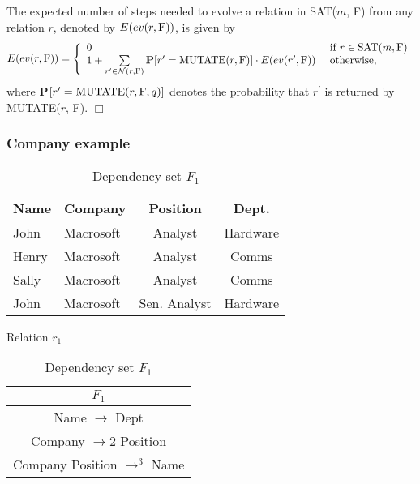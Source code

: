 \begin{proposition}\label{lemma:evolve}
\begin{rm}
The expected number of steps needed to evolve
a relation in SAT($m$, F) from any relation $r$, 
denoted by $E(ev(r, {\rm F}))$, is given by 
\begin{displaymath}
E(ev(r, {\rm F})) = \left\{ 
\begin{array}{l@{\quad}l}
0 & \mbox{ if } r \in {\rm SAT}(m, {\rm F}) \\
1 + \sum\limits_{r^\prime \in {\cal N}(r, {\rm F})} 
{\bf P}[r^\prime = {\rm MUTATE}(r, {\rm F})] \cdot
E(ev(r^\prime, {\rm F})) & \mbox{ otherwise,} \\
\end{array} \right.
\end{displaymath}
where {\bf P}$[r^\prime = {\rm MUTATE}(r, {\rm F}, q)]$ 
denotes the probability that $r^\prime$ is returned by MUTATE($r$, F).
\quad $\Box$
\end{rm}
\end{proposition}
\medskip

\subsubsection{Company example}

{\line
\begin{table}[ht]
\begin{minipage}[b]{16cm}
\begin{center}
\begin{tabular}{|l|l|c|c|} \hline
{\bf Name} & {\bf Company} & {\bf  Position} & {\bf Dept.}  \\ \hline \hline
John & Macrosoft & Analyst  & Hardware  \\ 
Henry & Macrosoft & Analyst  &  Comms\\
Sally & Macrosoft & Analyst  &  Comms \\ 
John & Macrosoft & Sen. Analyst  & Hardware \\ \hline
\end{tabular}
\end{center}
\caption{\label{table:1.1} Relation $r_1$}
\end{minipage}
\hfill
\begin{minipage}[b]{6cm}
\begin{center}
\begin{tabular}{|c|} \hline
{\bf $F_1$}\\ \hline \hline
Name $\to$ Dept  \\ 
Company $\to2$ Position \\
Company Position $\to^3$ Name \\ \hline
\end{tabular}
\end{center}
\caption{\label{table:1.2} Dependency set $F_1$}
\end{minipage}
\end{table}
}
\medskip

